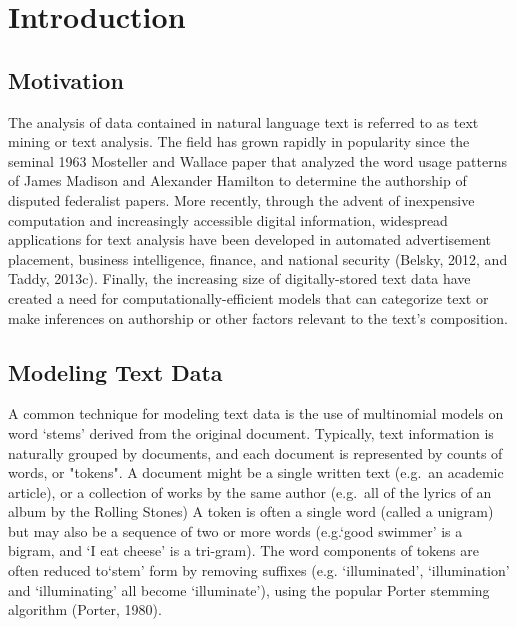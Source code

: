 \documentclass[12pt]{article}
\begin{document}
\vspace{1.5in}
\tableofcontents


\newpage


\section{Introduction}

\subsection{Motivation}


The analysis of data contained in natural language text is referred to as text mining or text analysis. 
The field has grown rapidly in popularity since the seminal 1963 Mosteller and Wallace paper that analyzed the
word usage patterns of James Madison and Alexander Hamilton to determine the authorship of disputed federalist papers.
More recently, through the advent of inexpensive computation and increasingly accessible digital information, widespread applications for text analysis have been developed in automated advertisement placement, business intelligence, finance, and national security (Belsky, 2012, and  Taddy, 2013c).
Finally, the increasing size of digitally-stored text data have created a need for computationally-efficient models that can categorize text or make inferences on authorship or other factors relevant to the text's composition. 

\subsection{Modeling Text Data}


A common technique for modeling text data is the use of multinomial models on word `stems' derived from the original document.
Typically, text information is naturally grouped by documents, and each
document is represented by counts of words, or "tokens". A document might be a
single written text (e.g.~an academic article), or a collection of works
by the same author (e.g.~all of the lyrics of an album by the Rolling
Stones) A token is often a single word (called a unigram) but may also be
a sequence of two or more words (e.g.`good swimmer' is a
bigram, and `I eat cheese' is a tri-gram). The word components of
tokens are often reduced to`stem' form by removing suffixes (e.g.
`illuminated', `illumination' and `illuminating' all become
`illuminate'), using the popular Porter stemming algorithm (Porter, 1980).
\end{document}
